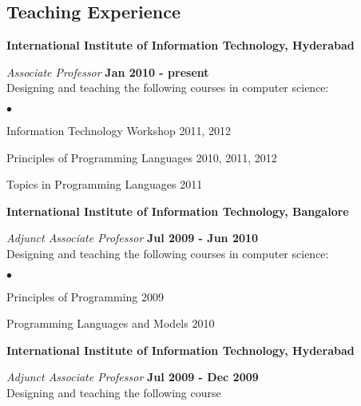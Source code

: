 \documentclass[11pt,margin,line]{res}
\newenvironment{list2}{
  \begin{list}{$\bullet$}{%
      \setlength{\itemsep}{0in}
      \setlength{\parsep}{0in} \setlength{\parskip}{0in}
      \setlength{\topsep}{0in} \setlength{\partopsep}{0in} 
      \setlength{\leftmargin}{0.2in}}}{\end{list}}
\begin{document}
\begin{resume}
\vspace{3em}

\section{\sc Teaching Experience}

{\bf International Institute of Information Technology, Hyderabad}

\vspace{-.5cm}

{\em Associate Professor} \hfill {\bf Jan 2010 - present}\\
Designing and teaching the following courses in computer
science:

\vspace*{1em}

\begin{list2}
\item Information Technology Workshop  2011, 2012
\item Principles of Programming Languages  2010, 2011, 2012
\item Topics in Programming Languages   2011
\end{list2}



{\bf International Institute of Information Technology, Bangalore}

\vspace{-.5cm}

{\em Adjunct Associate Professor} \hfill {\bf Jul 2009 - Jun 2010}\\
Designing and teaching the following courses in computer
science:

\vspace*{1em}

\begin{list2}
\item Principles of Programming  2009
\item Programming Languages and Models  2010
\end{list2}

{\bf International Institute of Information Technology, Hyderabad}

\vspace{-.5cm}

{\em Adjunct Associate Professor} \hfill {\bf Jul 2009 - Dec 2009}\\
Designing and teaching the following course


\vspace*{1em}



\end{resume}
\end{document}
